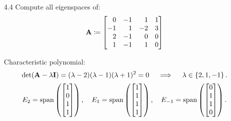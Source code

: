 \documentclass[11pt]{article}
\begin{document}
\begin{enumerate}
    \item[4.4] Compute all eigenspaces of:
          \[
              \mat{A} \coloneq
              \begin{bmatrix*}[r]
                  0 & -1 & 1 & 1 \\
                  -1 & 1 & -2 & 3 \\
                  2 & -1 & 0 & 0 \\
                  1 & -1 & 1 & 0 \\
              \end{bmatrix*}
          \]

          Characteristic polynomial:
          \[
              \det(\mathbf{A} - \lambda \mathbf{I}) = (\lambda - 2)(\lambda - 1)(\lambda + 1)^2 = 0
              \quad \implies \quad
              \lambda \in \left\{2, 1, -1\right\}.
          \]
          \[
              E_2 = \operatorname{span} \left(
                  \begin{bmatrix}
                      1 \\ 0 \\ 1 \\ 1
                  \end{bmatrix}
              \right)
              , \quad
              E_1 = \operatorname{span} \left(
                  \begin{bmatrix}
                      1 \\ 1 \\ 1 \\ 1
                  \end{bmatrix}
              \right)
              , \quad
              E_{-1} = \operatorname{span} \left(
                  \begin{bmatrix}
                      0 \\ 1 \\ 1 \\ 0
                  \end{bmatrix}
              \right)
              .
          \]


\end{enumerate}
\end{document}

